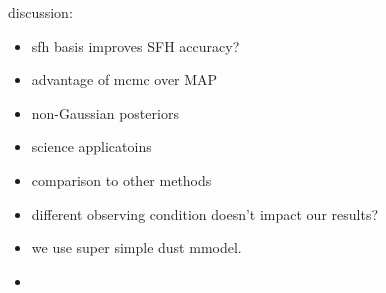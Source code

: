 discussion: 
\begin{itemize}
    \item sfh basis improves SFH accuracy? 
    \item advantage of mcmc over MAP
    \item non-Gaussian posteriors
    \item science applicatoins 
    \item comparison to other methods 
    \item different observing condition doesn't impact our results? 
    \item we use super simple dust mmodel.  
    \item {}
\end{itemize}

